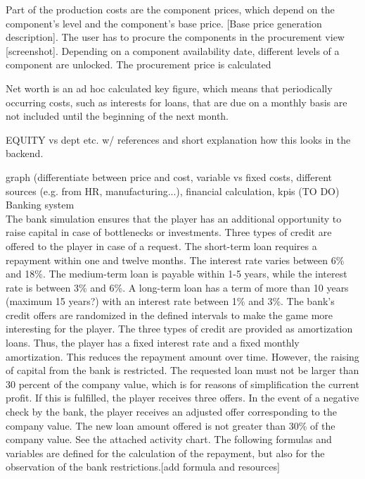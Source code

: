 Part of the production costs are the component prices, which depend on the component’s level and the component’s base price. [Base price generation description]. The user has to procure the components in the procurement view [screenshot]. Depending on a component availability date, different levels of a component are unlocked. The procurement price is calculated

Net worth is an ad hoc calculated key figure, which means that periodically occurring costs, such as interests for loans, that are due on a monthly basis are not included until the beginning of the next month. 

EQUITY vs dept etc. w/ references and short explanation how this looks in the backend. 

graph (differentiate between price and cost, variable vs fixed costs, different sources (e.g. from HR, manufacturing...), financial calculation, kpis (TO DO)\\


Banking system\\
The bank simulation ensures that the player has an additional opportunity to raise capital in case of bottlenecks or investments. Three types of credit are offered to the player in case of a request. 
The short-term loan requires a repayment within one and twelve months. The interest rate varies between 6\% and 18\%. The medium-term loan is payable within 1-5 years, while the interest rate is between 3\% and 6\%. A long-term loan has a term of more than 10 years (maximum 15 years?) with an interest rate between 1\% and 3\%. The bank's credit offers are randomized in the defined intervals to make the game more interesting for the player. The three types of credit are provided as amortization loans. Thus, the player has a fixed interest rate and a fixed monthly amortization. This reduces the repayment amount over time.
However, the raising of capital from the bank is restricted.
The requested loan must not be larger than 30 percent of the company value, which is for reasons of simplification the current profit. If this is fulfilled, the player receives three offers. In the event of a negative check by the bank, the player receives an adjusted offer corresponding to the company value. The new loan amount offered is not greater than 30\% of the company value. See the attached activity chart. 
The following formulas and variables are defined for the calculation of the repayment, but also for the observation of the bank restrictions.[add formula and resources]\\ 

